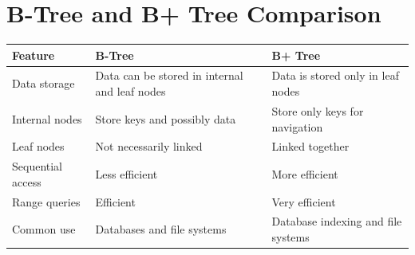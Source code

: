 \documentclass[12pt,a4paper]{article}
\begin{document}
\section{B-Tree and B+ Tree Comparison}

\begin{center}
\begin{tabular}{|p{4cm}|p{4cm}|p{4cm}|}
\hline
\textbf{Feature} & \textbf{B-Tree} & \textbf{B+ Tree} \\
\hline
Data storage & Data can be stored in internal and leaf nodes & Data is stored only in leaf nodes \\
\hline
Internal nodes & Store keys and possibly data & Store only keys for navigation \\
\hline
Leaf nodes & Not necessarily linked & Linked together \\
\hline
Sequential access & Less efficient & More efficient \\
\hline
Range queries & Efficient & Very efficient \\
\hline
Common use & Databases and file systems & Database indexing and file systems \\
\hline
\end{tabular}
\end{center}
\end{document}

